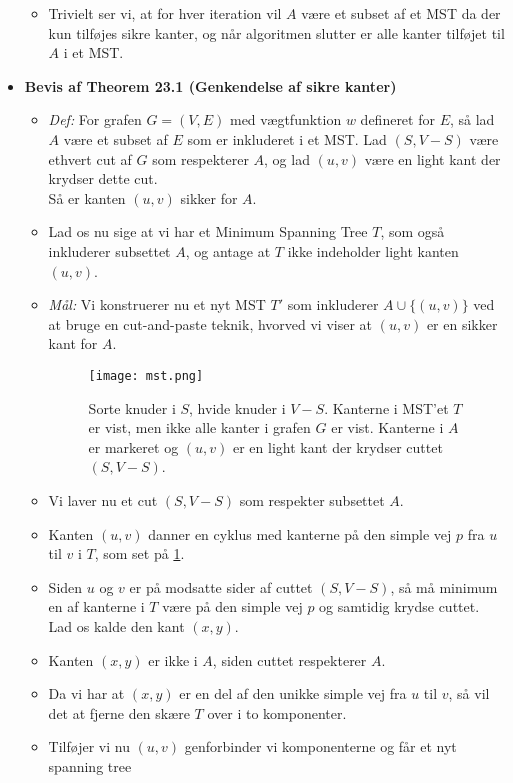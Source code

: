 \begin{itemize}
\begin{itemize}
	\item Trivielt ser vi, at for hver iteration vil $A$ være et subset af et MST da der kun tilføjes sikre kanter, og når algoritmen slutter er alle kanter tilføjet til $A$ i et MST.
\end{itemize}


\item \textbf{Bevis af Theorem 23.1 (Genkendelse af sikre kanter)}
\begin{itemize}
	\item \textit{Def:} For grafen $G = (V, E)$ med vægtfunktion $w$ defineret for $E$, så lad $A$ være et subset af $E$ som er inkluderet i et MST. Lad $(S, V-S)$ være ethvert cut af $G$ som respekterer $A$, og lad $(u,v)$ være en light kant der krydser dette cut.\\
	Så er kanten $(u, v)$ sikker for $A$.
	\item Lad os nu sige at vi har et Minimum Spanning Tree $T$, som også inkluderer subsettet $A$, og antage at $T$ ikke indeholder light kanten $(u, v)$.
	\item \textit{Mål:} Vi konstruerer nu et nyt MST $T'$ som inkluderer $A \cup \{(u, v)\}$ ved at bruge en cut-and-paste teknik, hvorved vi viser at $(u, v)$ er en sikker kant for $A$.
	 \begin{figure}[H]
	 	\begin{center}
	 		\texttt{[image: mst.png]}
	 	\end{center}
	 	\caption{Sorte knuder i $S$, hvide knuder i $V-S$. Kanterne i MST'et $T$ er vist, men ikke alle kanter i grafen $G$ er vist. Kanterne i $A$ er markeret og $(u,v)$ er en light kant der krydser cuttet $(S, V-S)$.}
	 	\label{fig:mst}
	 \end{figure}
 	\item Vi laver nu et cut $(S, V-S)$ som respekter subsettet $A$.
 	\item Kanten $(u, v)$ danner en cyklus med kanterne på den simple vej $p$ fra $u$ til $v$ i $T$, som set på \ref{fig:mst}.
 	\item Siden $u$ og $v$ er på modsatte sider af cuttet $(S, V-S)$, så må minimum en af kanterne i $T$ være på den simple vej $p$ og samtidig krydse cuttet. Lad os kalde den kant $(x, y)$.
 	\item Kanten $(x, y)$ er ikke i $A$, siden cuttet respekterer $A$.
 	\item Da vi har at $(x, y)$ er en del af den unikke simple vej fra $u$ til $v$, så vil det at fjerne den skære $T$ over i to komponenter.
 	\item Tilføjer vi nu $(u, v)$ genforbinder vi komponenterne og får et nyt spanning tree

\end{itemize}
\end{itemize}

